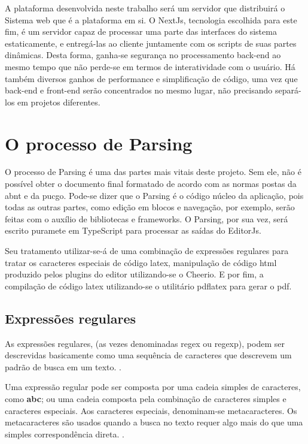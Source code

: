 A plataforma desenvolvida neste trabalho será
um servidor que distribuirá o Sistema
\acrshort{web}
que é a plataforma em si. O NextJs,
tecnologia escolhida para este fim,
é um servidor capaz de processar uma parte
das interfaces do sistema estaticamente, e
entregá-las ao cliente juntamente com os scripts
de suas partes dinâmicas. Desta forma,
ganha-se segurança no processamento back-end
ao mesmo tempo que não perde-se em termos de
interatividade com o usuário.
Há também diversos ganhos de performance e simplificação
de código, uma vez que back-end e front-end
serão concentrados no mesmo lugar, não precisando
separá-los em projetos diferentes.

\section{O processo de Parsing}

O processo de Parsing é uma das partes mais vitais deste projeto.
Sem ele, não é possível obter o documento final formatado de acordo
com as normas postas da
\acrshort{abnt}
e da
\acrshort{pucgo}.
Pode-se dizer que o Parsing é o código núcleo da aplicação, pois todas
as outras partes, como edição em blocos e navegação, por exemplo,
serão feitas com o auxílio de bibliotecas e frameworks. O Parsing,
por sua vez, será escrito puramete em TypeScript para processar as
saídas do EditorJs.

Seu tratamento utilizar-se-á de uma combinação de expressões regulares
para tratar os caracteres especiais de código
\acrshort{latex},
manipulação de código
\acrshort{html}
produzido pelos plugins do editor utilizando-se o Cheerio.
E por fim, a compilação de código
\acrshort{latex}
utilizando-se o utilitário pdflatex
para gerar o
\acrshort{pdf}.

\subsection{Expressões regulares}

As expressões regulares, (as vezes denominadas
\acrshort{regex}
ou
\acrshort{regexp}),
podem ser descrevidas basicamente como uma sequência de
caracteres que descrevem um padrão de busca em um texto.
\cite{dp6-regex}.

Uma expressão regular pode ser composta por uma cadeia simples de caracteres, como
\textbf{abc};
ou uma cadeia composta pela combinação de caracteres simples e caracteres especiais.
Aos caracteres especiais, denominam-se metacaracteres. Os metacaracteres são usados
quando a busca no texto requer algo mais do que uma simples correspondência direta.
\cite{mdn-regex}.

